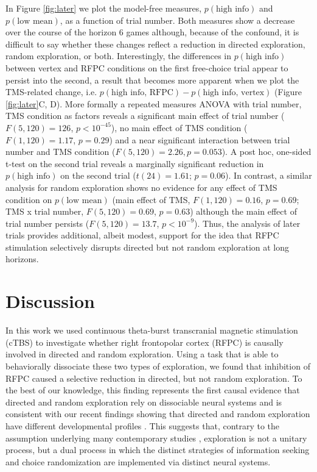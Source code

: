\documentclass[12pt]{article}
\begin{document}
In Figure \ref{fig:later} we plot the model-free measures, $p(\mbox{high info})$ and $p(\mbox{low mean})$, as a function of trial number. Both measures show a decrease over the course of the horizon 6 games although, because of the confound, it is difficult to say whether these changes reflect a reduction in directed exploration, random exploration, or both. Interestingly, the differences in $p(\mbox{high info})$ between vertex and RFPC conditions on the first free-choice trial appear to persist into the second, a result that becomes more apparent when we plot the TMS-related change, i.e. $p(\mbox{high info, RFPC}) - p(\mbox{high info, vertex})$ (Figure \ref{fig:later}C, D).  More formally a repeated measures ANOVA with trial number, TMS condition as factors reveals a significant main effect of trial number ($F(5,120) = 126$, $p < 10^{-45}$), no main effect of TMS condition ($F(1, 120) = 1.17$, $p = 0.29$) and a near significant interaction between trial number and TMS condition ($F(5, 120) = 2.26, p = 0.053$).  A post hoc, one-sided t-test on the second trial reveals a marginally significant reduction in $p(\mbox{high info})$ on the second trial ($t(24) = 1.61$; $p = 0.06$).  In contrast, a similar analysis for random exploration shows no evidence for any effect of TMS condition on $p(\mbox{low mean})$ (main effect of TMS, $F(1, 120) = 0.16$, $p = 0.69$; TMS x trial number, $F(5, 120) = 0.69$, $p = 0.63$) although the main effect of trial number persists ($F(5,120) = 13.7$, $p < 10^{-9}$).  Thus, the analysis of later trials provides additional, albeit modest, support for the idea that RFPC stimulation selectively disrupts directed but not random exploration at long horizons.





\section*{Discussion}
In this work we used continuous theta-burst transcranial magnetic stimulation (cTBS) to investigate whether right frontopolar cortex (RFPC) is causally involved in directed and random exploration.  Using a task that is able to behaviorally dissociate these two types of exploration, we found that inhibition of RFPC caused a selective reduction in directed, but not random exploration.  To the best of our knowledge, this finding represents the first causal evidence that directed and random exploration rely on dissociable neural systems and is consistent with our recent findings showing that directed and random exploration have different developmental profiles \cite{Somerville2017-fq}.  This suggests that, contrary to the assumption underlying many contemporary studies \cite{Daw2006-vw,Badre2012-nt}, exploration is not a unitary process, but a dual process in which the distinct strategies of information seeking and choice randomization are implemented via distinct neural systems.  
\end{document}

